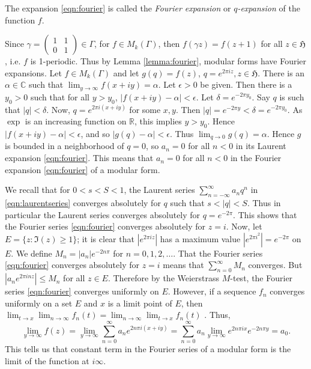 \documentclass{article}
\begin{document}
The expansion \eqref{eqn:fourier} is called the {\em Fourier expansion} or {\em $q$-expansion} of the function $f$.

Since $\gamma=\begin{pmatrix}1&1\\0&1\end{pmatrix} \in \Gamma$, for $f \in M_k(\Gamma)$, then
$f(\gamma z)=f(z+1)$ for all $z \in \mathfrak{H}$, i.e. $f$ is 1-periodic. Thus by Lemma \ref{lemma:fourier},
modular forms have Fourier expansions.
Let $f \in M_k(\Gamma)$ and let $g(q)=f(z)$, $q=e^{2\pi iz}, z \in \mathfrak{H}$.
There 
is an $\alpha \in \mathbb{C}$ such that
$\lim_{y \to \infty} f(x+iy)=\alpha$. Let $\epsilon>0$ be given. Then there is a $y_0>0$ such that for all $y>y_0$, $|f(x+iy)-\alpha|<\epsilon$. Let $\delta=e^{-2\pi y_0}$. Say $q$ is such that $|q|<\delta$. Now, $q=e^{2\pi i(x+iy)}$ for some $x,y$. Then $|q|=e^{-2\pi y}<\delta=e^{-2\pi y_0}$. As $\exp$ is an increasing function on $\mathbb{R}$, this implies $y>y_0$. Hence $|f(x+iy)-\alpha|<\epsilon$, and so $|g(q)-\alpha|<\epsilon$. Thus $\lim_{q \to 0} g(q)=\alpha$. Hence $g$ is bounded in a neighborhood of $q=0$, so
$a_n=0$ for all $n<0$ in its Laurent expansion \eqref{eqn:fourier}. This means that
$a_n=0$ for all $n<0$ in the Fourier expansion \eqref{eqn:fourier} of a modular form.  

We recall \cite[Chapter V, Theorem 2.1]{MR1659317} that for $0<s<S<1$, the Laurent series $\sum_{n=-\infty}^\infty a_n q^n$ in \eqref{eqn:laurentseries} converges absolutely for $q$ such that $s<|q|<S$. Thus in particular the Laurent series converges absolutely for $q=e^{-2\pi}$. This shows that the Fourier series \eqref{eqn:fourier} converges absolutely for $z=i$. Now, let $E=\{z:\Im(z) \geq 1\}$; it is clear that $|e^{2\pi iz}|$ has a maximum value $|e^{2\pi i^2}|=e^{-2\pi}$ on $E$. 
We define $M_n=|a_n|e^{-2n\pi}$ for $n=0,1,2,\ldots$. That the Fourier series \eqref{eqn:fourier} converges absolutely for $z=i$ means that $\sum_{n=0}^\infty M_n$ converges.
But $|a_ne^{2\pi inz}| \leq M_n$ for all $z \in E$. Therefore by the Weierstrass $M$-test, the Fourier series \eqref{eqn:fourier} converges uniformly on $E$.  
However, if a sequence $f_n$ converges uniformly on a set $E$ and $x$ is a limit point of $E$, then $\lim_{t \to x} \lim_{n \to \infty} f_n(t)=\lim_{n\to \infty} \lim_{t \to x} f_n(t)$ \cite[Theorem 7.11]{MR0385023}. Thus,
\begin{equation}
\label{eqn:constantterm}
\lim_{y \to \infty} f(z)=\lim_{y \to \infty} \sum_{n=0}^\infty a_n e^{2n\pi i(x+iy)}=\sum_{n=0}^\infty a_n \lim_{y \to \infty} e^{2n\pi ix}e^{-2n\pi y}=a_0.
\end{equation}
This tells us that constant term in the Fourier series of a modular form is the limit of the function at $i\infty$.
\end{document}

